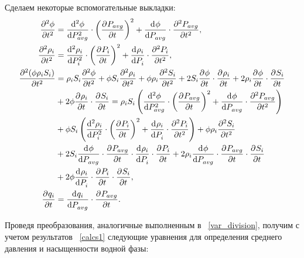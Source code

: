 Сделаем некоторые вспомогательные выкладки:
\begin{equation} \label{calcs1}
 \begin{aligned}
  \pd[2]{\phi}{t} &= \dd[2]{\phi}{P_{avg}} \cdot {\left( \pd{P_{avg}}{t}\right) }^2 + \dd{\phi}{P_{avg}} \cdot \pd[2]{P_{avg}}{t}, \\
  \pd[2]{\rho_i}{t} &= \dd[2]{\rho_i}{P_i} \cdot {\left( \pd{P_i}{t}\right) }^2 + \dd{\rho_i}{P_i} \cdot \pd[2]{P_i}{t}, \\
  \pd[2]{(\phi \rho_i S_i)}{t} &= \rho_i S_i \pd[2]{\phi}{t} + \phi S_i \pd[2]{\rho_i}{t} + \phi \rho_i \pd[2]{S_i}{t} +
  2S_i \pd{\phi}{t} \cdot \pd{\rho_i}{t} + 2\rho_i \pd{\phi}{t} \cdot \pd{S_i}{t} \\
  &+ 2\phi \pd{\rho_i}{t} \cdot \pd{S_i}{t} = \rho_i S_i \left(  \dd[2]{\phi}{P_{avg}} \cdot {\left( \pd{P_{avg}}{t}\right) }^2 + \dd{\phi}{P_{avg}} \cdot \pd[2]{P_{avg}}{t} \right) \\
  &+ \phi S_i \left( \dd[2]{\rho_i}{P_i} \cdot {\left( \pd{P_i}{t}\right) }^2 + \dd{\rho_i}{P_i} \cdot \pd[2]{P_i}{t} \right) + \phi \rho_i \pd[2]{S_i}{t} \\
  &+ 2S_i \dd{\phi}{P_{avg}} \cdot \pd{P_{avg}}{t} \cdot \dd{\rho_i}{P_i} \cdot \pd{P_i}{t} + 2\rho_i \dd{\phi}{P_{avg}} \cdot \pd{P_{avg}}{t} \cdot \pd{S_i}{t} \\
  &+ 2\phi \dd{\rho_i}{P_i} \cdot \pd{P_i}{t} \cdot \pd{S_i}{t}, \\
  \pd{q_i}{t} &= \dd{q_i}{P_{avg}} \cdot \pd{P_{avg}}{t}.
 \end{aligned}
\end{equation}

Проведя преобразования, аналогичные выполненным в ~\ref{var_division}, получим с учетом результатов ~\eqref{calcs1} следующие уравнения для определения
среднего давления и насыщенности водной фазы:

